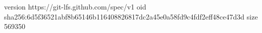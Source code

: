 version https://git-lfs.github.com/spec/v1
oid sha256:6d5f36521abf8b65146b116408826817dc2a45e0a58fd9c4fdf2eff48ce47d3d
size 569350
